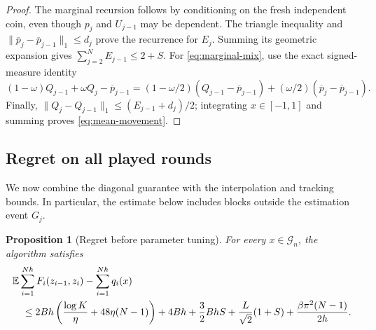\documentclass[11pt]{article}
\newtheorem{proposition}[theorem]{Proposition}
\theoremstyle{definition}
\newcommand{\E}{\mathbb E}
\begin{document}
\begin{proof}
The marginal recursion follows by conditioning on the fresh independent coin, even though $p_j$ and $U_{j-1}$ may be dependent. The triangle inequality and
$\|\overline p_j-\overline p_{j-1}\|_1\leq d_j$ prove the recurrence for $E_j$. Summing its geometric expansion gives $\sum_{j=2}^N E_{j-1}\leq2+S$.
For \eqref{eq:marginal-mix}, use the exact signed-measure identity
\[
 (1-\omega)Q_{j-1}+\omega Q_j-\overline p_{j-1}
 =(1-\omega/2)(Q_{j-1}-\overline p_{j-1})
       +(\omega/2)(\overline p_j-\overline p_{j-1}).
\]
Finally,
$\|Q_j-Q_{j-1}\|_1\leq(E_{j-1}+d_j)/2$; integrating $x\in[-1,1]$ and summing proves \eqref{eq:mean-movement}.
\end{proof}

\subsection{Regret on all played rounds}

We now combine the diagonal guarantee with the interpolation and tracking bounds. In particular, the estimate below includes blocks outside the estimation event $G_j$.

\begin{proposition}[Regret before parameter tuning]\label{prop:physical}
For every $x\in\mathcal G_n$, the algorithm satisfies
\begin{align}\label{eq:raw-upper}
 &\E\sum_{i=1}^{Nh}F_i(z_{i-1},z_i)-\sum_{i=1}^{Nh}q_i(x)\notag\\
 &\quad\leq
 2Bh\left(\frac{\log K}{\eta}+48\eta(N-1)\right)
 +4Bh+\frac32BhS+\frac{L}{\sqrt2}(1+S)
 +\frac{\beta\pi^2(N-1)}{2h}.
\end{align}
\end{proposition}
\end{document}
